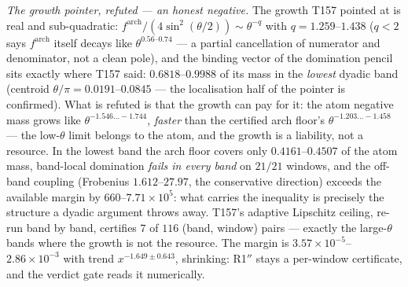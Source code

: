 \documentclass[11pt,a4paper]{article}
\begin{document}
\emph{The growth pointer, refuted --- an honest negative.} The growth T157 pointed at
is real and sub-quadratic: $f^{\mathrm{arch}}/(4\sin^2(\theta/2))\sim\theta^{-q}$ with
$q=1.259$--$1.438$ ($q<2$ says $f^{\mathrm{arch}}$ itself decays like
$\theta^{0.56\text{--}0.74}$ --- a partial cancellation of numerator and denominator,
not a clean pole), and the binding vector of the domination pencil sits exactly where
T157 said: $0.6818$--$0.9988$ of its mass in the \emph{lowest} dyadic band (centroid
$\theta/\pi=0.0191$--$0.0845$ --- the localisation half of the pointer is confirmed).
What is refuted is that the growth can pay for it: the atom negative mass grows like
$\theta^{-1.546\ldots-1.744}$, \emph{faster} than the certified arch floor's
$\theta^{-1.203\ldots-1.458}$ --- the low-$\theta$ limit belongs to the atom, and the
growth is a liability, not a resource. In the lowest band the arch floor covers only
$0.4161$--$0.4507$ of the atom mass, band-local domination \emph{fails in every band}
on $21/21$ windows, and the off-band coupling (Frobenius $1.612$--$27.97$, the
conservative direction) exceeds the available margin by $660$--$7.71\times10^{5}$:
what carries the inequality is precisely the structure a dyadic argument throws away.
T157's adaptive Lipschitz ceiling, re-run band by band, certifies $7$ of $116$
(band, window) pairs --- exactly the large-$\theta$ bands where the growth is not the
resource. The margin is $3.57\times10^{-5}$--$2.86\times10^{-3}$ with trend
$x^{-1.649\pm0.643}$, shrinking: R1$''$ stays a per-window certificate, and the verdict
gate reads it numerically.
\end{document}
